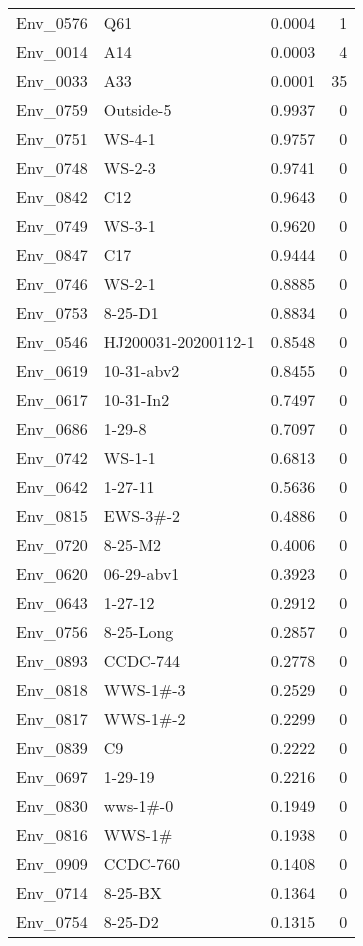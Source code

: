 \begin{longtable}{llrr}
  Env\_0576 & Q61 & 0.0004 &     1 \\ 
  Env\_0014 & A14 & 0.0003 &     4 \\ 
  Env\_0033 & A33 & 0.0001 &    35 \\ 
  Env\_0759 & Outside-5 & 0.9937 &     0 \\ 
  Env\_0751 & WS-4-1 & 0.9757 &     0 \\ 
  Env\_0748 & WS-2-3 & 0.9741 &     0 \\ 
  Env\_0842 & C12 & 0.9643 &     0 \\ 
  Env\_0749 & WS-3-1 & 0.9620 &     0 \\ 
  Env\_0847 & C17 & 0.9444 &     0 \\ 
  Env\_0746 & WS-2-1 & 0.8885 &     0 \\ 
  Env\_0753 & 8-25-D1 & 0.8834 &     0 \\ 
  Env\_0546 & HJ200031-20200112-1 & 0.8548 &     0 \\ 
  Env\_0619 & 10-31-abv2 & 0.8455 &     0 \\ 
  Env\_0617 & 10-31-In2 & 0.7497 &     0 \\ 
  Env\_0686 & 1-29-8 & 0.7097 &     0 \\ 
  Env\_0742 & WS-1-1 & 0.6813 &     0 \\ 
  Env\_0642 & 1-27-11 & 0.5636 &     0 \\ 
  Env\_0815 & EWS-3\#-2 & 0.4886 &     0 \\ 
  Env\_0720 & 8-25-M2 & 0.4006 &     0 \\ 
  Env\_0620 & 06-29-abv1 & 0.3923 &     0 \\ 
  Env\_0643 & 1-27-12 & 0.2912 &     0 \\ 
  Env\_0756 & 8-25-Long & 0.2857 &     0 \\ 
  Env\_0893 & CCDC-744 & 0.2778 &     0 \\ 
  Env\_0818 & WWS-1\#-3 & 0.2529 &     0 \\ 
  Env\_0817 & WWS-1\#-2 & 0.2299 &     0 \\ 
  Env\_0839 & C9 & 0.2222 &     0 \\ 
  Env\_0697 & 1-29-19 & 0.2216 &     0 \\ 
  Env\_0830 & wws-1\#-0 & 0.1949 &     0 \\ 
  Env\_0816 & WWS-1\# & 0.1938 &     0 \\ 
  Env\_0909 & CCDC-760 & 0.1408 &     0 \\ 
  Env\_0714 & 8-25-BX & 0.1364 &     0 \\ 
  Env\_0754 & 8-25-D2 & 0.1315 &     0 \\ 

\end{longtable}
